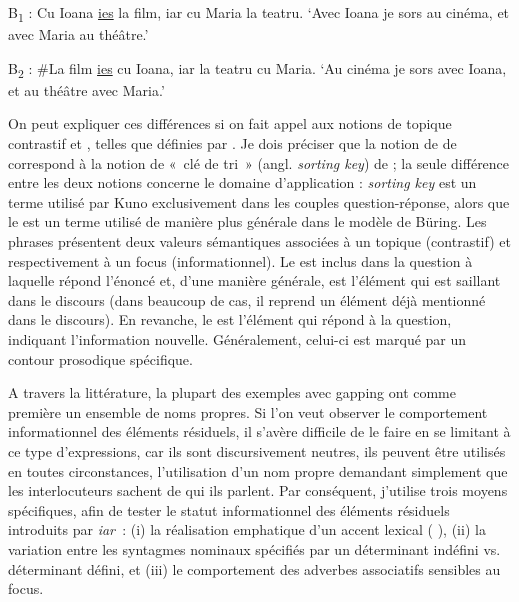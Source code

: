 \ea B\textsubscript{1} : Cu Ioana \uline{ies} la film, iar cu Maria la teatru. 
\glt ‘Avec Ioana je sors au cinéma, et avec Maria au théâtre.’   

\ex B\textsubscript{2} : \#La film \uline{ies} cu Ioana, iar la teatru cu Maria. 
\glt ‘Au cinéma je sors avec Ioana, et au théâtre avec Maria.’   
\z
\z

On peut expliquer ces différences si on fait appel aux notions de topique con\-trastif et , telles que définies par \citet{Buring2003}. Je dois préciser que la notion de  de \citet{Buring2003} correspond à la notion de «~clé de tri~» (angl. \textit{sorting key}) de \citet{Kuno1982} ; la seule différence entre les deux notions concerne le domaine d’application : \textit{sorting key} est un terme utilisé par Kuno exclusivement dans les couples question-réponse, alors que le  est un terme utilisé de manière plus générale dans le modèle de Büring. Les phrases présentent deux valeurs sémantiques associées à un topique (contrastif) et respectivement à un focus (informationnel). Le  est inclus dans la question à laquelle répond l’énoncé et, d’une manière générale, est l’élément qui est saillant dans le discours (dans beaucoup de cas, il reprend un élément déjà mentionné dans le discours). En revanche, le  est l’élément qui répond à la question, indiquant l’information nouvelle. Généralement, celui-ci est marqué par un contour prosodique spécifique. 

A travers la littérature, la plupart des exemples avec gapping ont comme première  un ensemble de noms propres. Si l’on veut observer le comportement informationnel des éléments résiduels, il s’avère difficile de le faire en se limitant à ce type d’expressions, car ils sont discursivement neutres, {\cad} ils peuvent être utilisés en toutes circonstances, l’utilisation d’un nom propre demandant simplement que les interlocuteurs sachent de qui ils parlent. Par conséquent, j’utilise trois moyens spécifiques, afin de tester le statut informationnel des éléments résiduels introduits par \textit{iar~}: (i) la réalisation emphatique d’un accent lexical ({\cad} ), (ii) la variation entre les syntagmes nominaux spécifiés par un déterminant indéfini vs. déterminant défini, et (iii) le comportement des adverbes associatifs sensibles au focus. 

